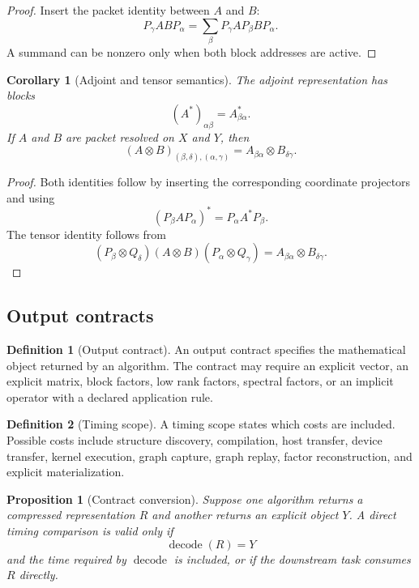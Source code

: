 \documentclass{aomart}
\newtheorem{proposition}[proposition]{Proposition}
\newtheorem{corollary}[corollary]{Corollary}
\theoremstyle{definition}
\newtheorem{definition}[definition]{Definition}
\theoremstyle{remark}
\begin{document}
\begin{proof}
Insert the packet identity between \(A\) and \(B\):
\[
P_\gamma ABP_\alpha
=
\sum_\beta
P_\gamma AP_\beta BP_\alpha.
\]
A summand can be nonzero only when both block addresses are active.
\end{proof}

\begin{corollary}[Adjoint and tensor semantics]\label{cor:adjoint_tensor}
The adjoint representation has blocks
\[
(A^*)_{\alpha\beta}=A_{\beta\alpha}^*.
\]
If \(A\) and \(B\) are packet resolved on \(X\) and \(Y\), then
\[
(A\otimes B)_{(\beta,\delta),(\alpha,\gamma)}
=
A_{\beta\alpha}\otimes B_{\delta\gamma}.
\]
\end{corollary}

\begin{proof}
Both identities follow by inserting the corresponding coordinate projectors and using
\[
(P_\beta AP_\alpha)^*=P_\alpha A^*P_\beta.
\]
The tensor identity follows from
\[
(P_\beta\otimes Q_\delta)
(A\otimes B)
(P_\alpha\otimes Q_\gamma)
=
A_{\beta\alpha}\otimes B_{\delta\gamma}.
\]
\end{proof}

\subsection{Output contracts}

\begin{definition}[Output contract]\label{def:output_contract}
An output contract specifies the mathematical object returned by an algorithm. The contract may require an explicit vector, an explicit matrix, block factors, low rank factors, spectral factors, or an implicit operator with a declared application rule.
\end{definition}

\begin{definition}[Timing scope]\label{def:timing_scope}
A timing scope states which costs are included. Possible costs include structure discovery, compilation, host transfer, device transfer, kernel execution, graph capture, graph replay, factor reconstruction, and explicit materialization.
\end{definition}

\begin{proposition}[Contract conversion]\label{prop:contract_conversion}
Suppose one algorithm returns a compressed representation \(R\) and another returns an explicit object \(Y\). A direct timing comparison is valid only if
\[
\operatorname{decode}(R)=Y
\]
and the time required by \(\operatorname{decode}\) is included, or if the downstream task consumes \(R\) directly.
\end{proposition}
\end{document}
